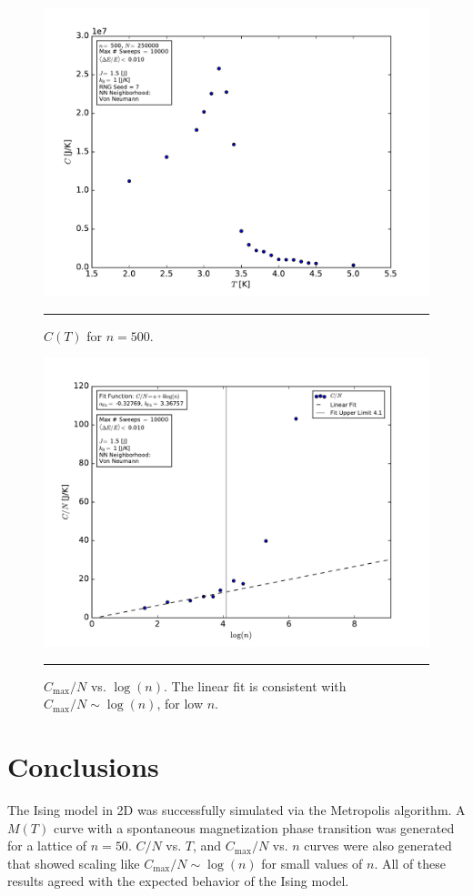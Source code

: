 \documentclass[notitlepage,aps,prd,nofootinbib]{revtex4-1}
\begin{document}
\begin{figure}[!htbc]
  \centering
  \includegraphics[width=.75\textwidth]{../output/plots_for_paper_von_neumann/part_b/CT_for_n500.pdf}
	{\par\nobreak\rule[9pt]{35em}{0.5pt}\vspace{-5mm}}
	\caption{$C\left(T\right)$ for $n=500$.}
	\label{fig:CT_n500}
\end{figure}


\clearpage
\begin{figure}[!htbc]
  \centering
  \includegraphics[width=.82\textwidth]{../output/plots_for_paper_von_neumann/part_b/Cmax_over_N_vs_n.pdf}
	{\par\nobreak\rule[9pt]{35em}{0.5pt}\vspace{-5mm}}
	\caption{$C_{\mathrm{max}}/N$ vs. $\log(n)$. The linear fit is consistent with $C_{\mathrm{max}}/N \sim \log(n)$, for low $n$.}
	\label{fig:Cmax_over_N_vs_n}
\end{figure}


\section{Conclusions}
\label{sec:Conclusions}
The Ising model in 2D was successfully simulated via the Metropolis algorithm. A $M\left(T\right)$ curve with a spontaneous magnetization phase transition was generated for a lattice of $n=50$. $C/N$ vs. $T$, and $C_{\mathrm{max}}/N$ vs. $n$ curves were also generated that showed scaling like $C_{\mathrm{max}}/N \sim \log(n)$ for small values of $n$. All of these results agreed with the expected behavior of the Ising model.
\end{document}
